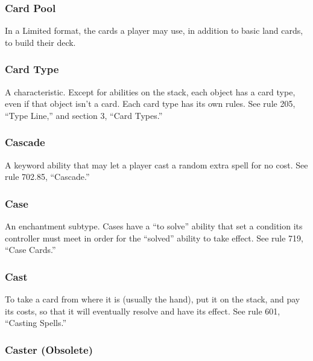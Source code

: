 {{{\subsubsection*{Card Pool}

In a Limited format, the cards a player may use, in addition to basic land cards, to build their deck.

\subsubsection*{Card Type}

A characteristic. Except for abilities on the stack, each object has a card type, even if that object isn’t a card. Each card type has its own rules. See rule 205, “Type Line,” and section 3, “Card Types.”

\subsubsection*{Cascade}

A keyword ability that may let a player cast a random extra spell for no cost. See rule 702.85, “Cascade.”

\subsubsection*{Case}

An enchantment subtype. Cases have a “to solve” ability that set a condition its controller must meet in order for the “solved” ability to take effect. See rule 719, “Case Cards.”

\subsubsection*{Cast}

To take a card from where it is (usually the hand), put it on the stack, and pay its costs, so that it will eventually resolve and have its effect. See rule 601, “Casting Spells.”

\subsubsection*{Caster (Obsolete)}

}}}
